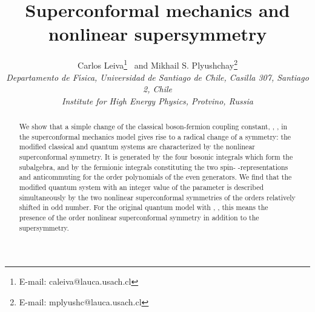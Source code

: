 \documentclass[a4paper,12pt]{article}
\def\N{\mathbb N}
\begin{document}
\title{
{\bf Superconformal mechanics and nonlinear
supersymmetry}}

\author{{\sf Carlos Leiva\coordHE{}}\thanks{
E-mail: caleiva@lauca.usach.cl}
{\sf\ and Mikhail S. Plyushchay\coordHE{}}\thanks{
E-mail: mplyushc@lauca.usach.cl}
\\
{\small {\it {}\coordHE{}Departamento de F\'{\i}sica,
Universidad de Santiago de Chile,
Casilla 307, Santiago 2, Chile}}\\
{\small {\it {}\coordHE{}Institute for High Energy Physics,
Protvino, Russia}}}
\date{}












\maketitle


\begin{abstract}
We show that a simple change of the classical
boson-fermion coupling
constant,
\coordHE{}, \myHighlight{$n\in \N$}\coordHE{}, in the
superconformal mechanics model
gives rise to a radical
change of a symmetry:
the modified classical and quantum
systems are characterized by the nonlinear
superconformal symmetry.
It is generated by
the four bosonic integrals
which form the \coordHE{} subalgebra,
and  by the \coordHE{} fermionic integrals
constituting the two
spin-\coordHE{}  \coordHE{}-representations
and anticommuting for the order
\coordHE{} polynomials of the even generators.
We find that the modified
quantum system with an integer
value of the parameter \myHighlight{$\alpha$}\coordHE{}
is described simultaneously
by the two nonlinear superconformal
symmetries of the orders relatively shifted in odd number.
For the original
quantum model with \coordHE{}, \myHighlight{$p\in \N$}\coordHE{},
this means the presence
of the order \coordHE{} nonlinear superconformal
symmetry in addition to the
\coordHE{} supersymmetry.
\end{abstract}
\end{document}
